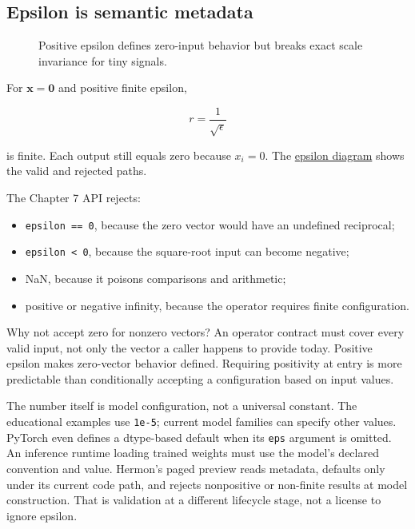 \documentclass[
  10pt,
]{article}
\providecommand{\tightlist}{%
  \setlength{\itemsep}{0pt}\setlength{\parskip}{0pt}}
\begin{document}
\subsection{Epsilon is semantic
metadata}\label{epsilon-is-semantic-metadata}

\begin{figure}[H]\centering\resizebox{\linewidth}{!}{}\caption{Positive epsilon defines zero-input behavior but breaks exact scale invariance for tiny signals.}\end{figure}

For \(\mathbf{x}=\mathbf{0}\) and positive finite epsilon,

\[
r=\frac{1}{\sqrt{\epsilon}}
\]

is finite. Each output still equals zero because \(x_i=0\). The
\href{https://github.com/hermonai/inside-the-llm-engine/blob/astra-visual-rewrite/diagrams/transformer/epsilon-zero-vector.txt}{epsilon
diagram} shows the valid and rejected paths.

The Chapter 7 API rejects:

\begin{itemize}
\tightlist
\item
  \texttt{epsilon\ ==\ 0}, because the zero vector would have an
  undefined reciprocal;
\item
  \texttt{epsilon\ \textless{}\ 0}, because the square-root input can
  become negative;
\item
  NaN, because it poisons comparisons and arithmetic;
\item
  positive or negative infinity, because the operator requires finite
  configuration.
\end{itemize}

Why not accept zero for nonzero vectors? An operator contract must cover
every valid input, not only the vector a caller happens to provide
today. Positive epsilon makes zero-vector behavior defined. Requiring
positivity at entry is more predictable than conditionally accepting a
configuration based on input values.

The number itself is model configuration, not a universal constant. The
educational examples use \texttt{1e-5}; current model families can
specify other values. PyTorch even defines a dtype-based default when
its \texttt{eps} argument is omitted. An inference runtime loading
trained weights must use the model's declared convention and value.
Hermon's paged preview reads
\texttt{} metadata,
defaults only under its current code path, and rejects nonpositive or
non-finite results at model construction. That is validation at a
different lifecycle stage, not a license to ignore epsilon.
\end{document}
